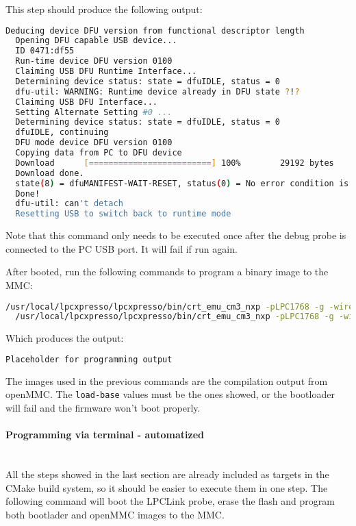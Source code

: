 \documentclass[letterpaper,12pt, titlepage]{article}
\newcommand{\newparagraph}[1]{\paragraph{#1}\mbox{}\\}
\begin{document}
This step should produce the following output:

\begin{lstlisting}[language=bash]
  Deducing device DFU version from functional descriptor length
  Opening DFU capable USB device...
  ID 0471:df55
  Run-time device DFU version 0100
  Claiming USB DFU Runtime Interface...
  Determining device status: state = dfuIDLE, status = 0
  dfu-util: WARNING: Runtime device already in DFU state ?!?
  Claiming USB DFU Interface...
  Setting Alternate Setting #0 ...
  Determining device status: state = dfuIDLE, status = 0
  dfuIDLE, continuing
  DFU mode device DFU version 0100
  Copying data from PC to DFU device
  Download      [=========================] 100%        29192 bytes
  Download done.
  state(8) = dfuMANIFEST-WAIT-RESET, status(0) = No error condition is present
  Done!
  dfu-util: can't detach
  Resetting USB to switch back to runtime mode
\end{lstlisting}

Note that this command only needs to be executed once after the debug probe is connected to the PC USB port. It will fail if run again.

After booted, run the following commands to program a binary image to the MMC:

\begin{lstlisting}[language=bash]
  /usr/local/lpcxpresso/lpcxpresso/bin/crt_emu_cm3_nxp -pLPC1768 -g -wire=winusb -load-base=0 -flash-load-exec=bootloader.bin
  /usr/local/lpcxpresso/lpcxpresso/bin/crt_emu_cm3_nxp -pLPC1768 -g -wire=winusb -load-base=0x2000 -flash-load-exec=openMMC.bin
\end{lstlisting}

Which produces the output:

\begin{lstlisting}[language=bash]
  Placeholder for programming output
\end{lstlisting}

The images used in the previous commands are the compilation output from openMMC. The \texttt{load-base} values must be the ones showed, or the bootloader will fail and the firmware won't boot properly.

\newparagraph{Programming via terminal - automatized}
All the steps showed in the last section are already included as targets in the CMake build system, so it should be easier to execute them in one step. The following command will boot the LPCLink probe, erase the flash and program both bootlader and openMMC images to the MMC.
\end{document}
